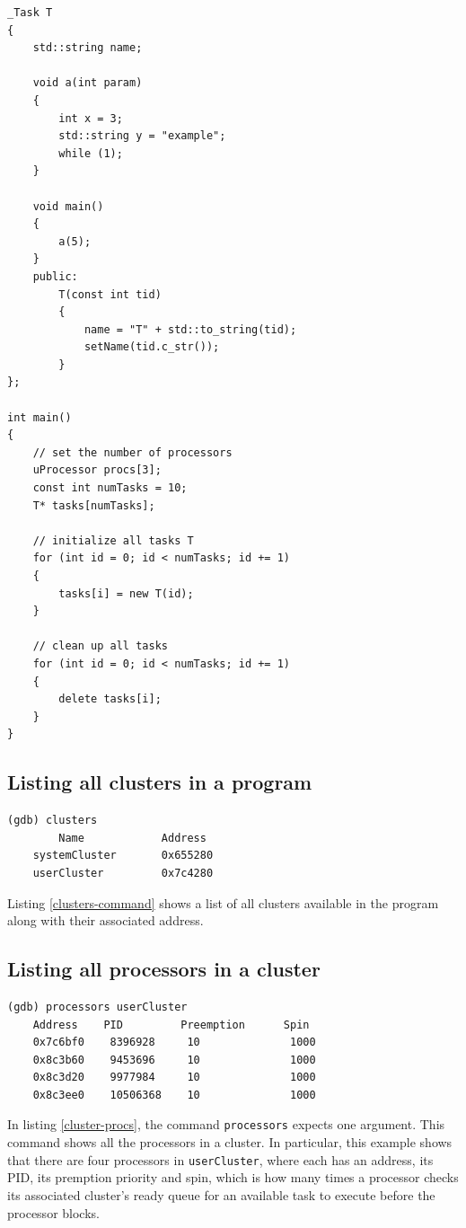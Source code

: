 \begin{lstlisting}[style=C++, caption={\uCPPS source code used for GDB commands},
label={uCPP-src-code}, basicstyle=\small]
_Task T
{
    std::string name;

    void a(int param)
    {
        int x = 3;
        std::string y = "example";
        while (1);
    }

    void main()
    {
        a(5);
    }
    public:
        T(const int tid)
        {
            name = "T" + std::to_string(tid);
            setName(tid.c_str());
        }
};

int main()
{
    // set the number of processors
    uProcessor procs[3];
    const int numTasks = 10;
    T* tasks[numTasks];

    // initialize all tasks T
    for (int id = 0; id < numTasks; id += 1)
    {
        tasks[i] = new T(id);
    }

    // clean up all tasks
    for (int id = 0; id < numTasks; id += 1)
    {
        delete tasks[i];
    }
}
\end{lstlisting}

\subsection{Listing all clusters in a \uCPPS program}
\begin{lstlisting}[caption={clusters command}, label={clusters-command}]
(gdb) clusters
        Name            Address
    systemCluster       0x655280
    userCluster         0x7c4280
\end{lstlisting}
Listing \ref{clusters-command} shows a list of all clusters available in the
program
along with their associated address.

\subsection{Listing all processors in a cluster}
\begin{lstlisting}[caption={processors command}, label={cluster-procs}]
(gdb) processors userCluster
    Address    PID         Preemption      Spin
    0x7c6bf0    8396928     10              1000
    0x8c3b60    9453696     10              1000
    0x8c3d20    9977984     10              1000
    0x8c3ee0    10506368    10              1000
\end{lstlisting}
In listing \ref{cluster-procs}, the command \verb|processors| expects one
argument. This command shows
all the processors in a cluster. In particular, this example shows that there
are four processors in \verb|userCluster|, where each has an address,
its PID, its premption priority and spin, which is how many times a processor
checks its associated cluster's ready queue for an available task to execute
before the processor blocks.

